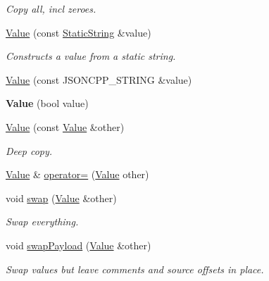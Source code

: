\begin{DoxyCompactItemize}
\begin{DoxyCompactList}\small\item\em Copy all, incl zeroes. \end{DoxyCompactList}\item 
\hyperlink{classJson_1_1Value_a081830e95f88a37054da7e46c65b0766}{Value} (const \hyperlink{classJson_1_1StaticString}{Static\+String} \&value)
\begin{DoxyCompactList}\small\item\em Constructs a value from a static string. \end{DoxyCompactList}\item 
\hyperlink{classJson_1_1Value_a89ef37969ff7c6eb3a7afcca03d4cd4a}{Value} (const J\+S\+O\+N\+C\+P\+P\+\_\+\+S\+T\+R\+I\+NG \&value)
\item 
\mbox{\label{classJson_1_1Value_a350a31ea4a30d384994b0bc010b17495}} 
{\bfseries Value} (bool value)
\item 
\mbox{\label{classJson_1_1Value_a436dfd3670f95fd665f680eba5cebcf0}} 
\hyperlink{classJson_1_1Value_a436dfd3670f95fd665f680eba5cebcf0}{Value} (const \hyperlink{classJson_1_1Value}{Value} \&other)
\begin{DoxyCompactList}\small\item\em Deep copy. \end{DoxyCompactList}\item 
\hyperlink{classJson_1_1Value}{Value} \& \hyperlink{classJson_1_1Value_a795acb28772da4c5d85ae8f4af36c69f}{operator=} (\hyperlink{classJson_1_1Value}{Value} other)
\item 
\mbox{\label{classJson_1_1Value_aab841120d78e296e1bc06a373345e822}} 
void \hyperlink{classJson_1_1Value_aab841120d78e296e1bc06a373345e822}{swap} (\hyperlink{classJson_1_1Value}{Value} \&other)
\begin{DoxyCompactList}\small\item\em Swap everything. \end{DoxyCompactList}\item 
\mbox{\label{classJson_1_1Value_a5263476047f20e2fc6de470e4de34fe5}} 
void \hyperlink{classJson_1_1Value_a5263476047f20e2fc6de470e4de34fe5}{swap\+Payload} (\hyperlink{classJson_1_1Value}{Value} \&other)
\begin{DoxyCompactList}\small\item\em Swap values but leave comments and source offsets in place. \end{DoxyCompactList}\item 

\end{DoxyCompactItemize}
